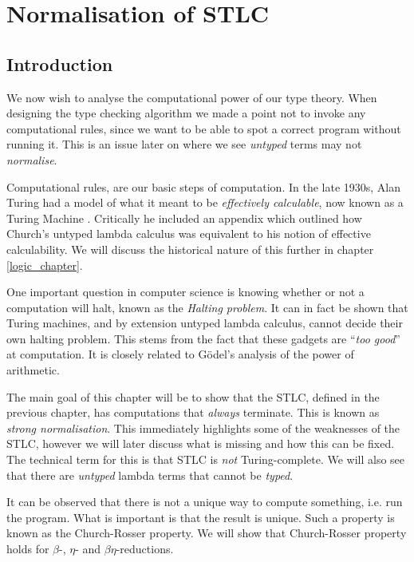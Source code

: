 \section{Normalisation of STLC}


\subsection{Introduction}
We now wish to analyse the computational power of our type theory.
When designing the type checking algorithm we made a point not to invoke any computational rules, since we want to be able to spot a correct program without running it. This is an issue later on where we see \emph{untyped} terms may not \emph{normalise}.

Computational rules, are our basic steps of computation. In the late 1930s, Alan Turing had a model of what it meant to be \emph{effectively calculable}, now known as a Turing Machine \cite{turing1936a}. Critically he included an appendix which outlined how Church's untyped lambda calculus was equivalent to his notion of effective calculability. We will discuss the historical nature of this further in chapter \ref{logic_chapter}.

One important question in computer science is knowing whether or not a computation will halt, known as the \emph{Halting problem}. It can in fact be shown that Turing machines, and by extension untyped lambda calculus, cannot decide their own halting problem. This stems from the fact that these gadgets are ``\emph{too good}'' at computation. It is closely related to G\"odel's analysis of the power of arithmetic. \cite{}

The main goal of this chapter will be to show that the STLC, defined in the previous chapter, has computations that \emph{always} terminate. This is known as \emph{strong normalisation}. This immediately highlights some of the weaknesses of the STLC, however we will later discuss what is missing and how this can be fixed. The technical term for this is that STLC is \emph{not} Turing-complete. \cite{} We will also see that there are \emph{untyped} lambda terms that cannot be \emph{typed}.

It can be observed that there is not a unique way to compute something, i.e. run the program. What is important is that the result is unique. Such a property is known as the Church-Rosser property. We will show that Church-Rosser property holds for $\beta$-, $\eta$- and $\beta\eta$-reductions. 

